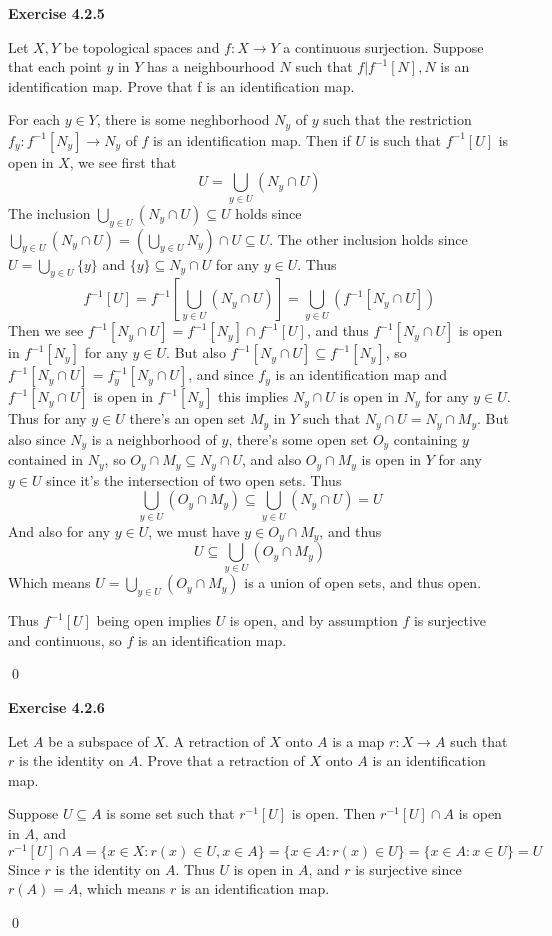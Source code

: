 \documentclass[12pt]{article}
\newcommand{\qcolor}{Gray}
\newcommand{\acolor}{Black}
\newcommand{\question}[1]{
	\color{\qcolor} 
	\item[#1~]}
\newcommand{\answer}[0]{
	\color{\acolor} 
	\item[]}
\newenvironment{exercise}[1]
{
	{
		\Large
		\color{\acolor}
		\addtolength\leftskip{-2em}
		\textbf{Exercise #1}
		
	}
	\begin{list}{}
	{
		\setlength\leftmargin{1em}
		\setlength\rightmargin{0em}
		\setlength\labelwidth{2em}
		\setlength\itemsep{0em}
		\setlength\parsep{0.5em}
		\setlength\baselineskip{1.25em}
	}
}
{
  \qed{}
  \end{list}
}
\begin{document}
\begin{exercise}{4.2.5}
  \question{} Let $X, Y$ be topological spaces and $f : X \to Y$ a continuous surjection. Suppose that each point $y$ in $Y$ has a neighbourhood $N$ such that $f| f^{-1}[N], N$ is an identification map. Prove that f is an identification map.
  \answer
  For each $y \in Y$, there is some neghborhood $N_y$ of $y$ such that the restriction $f_y : f^{-1}[N_y] \to N_y$ of $f$ is an identification map. Then if $U$ is such that $f^{-1}[U]$ is open in $X$, we see first that
  $$U = \bigcup_{y \in U} (N_y \cap U)$$
  The inclusion $\bigcup_{y \in U} (N_y \cap U) \subseteq U$ holds since $\bigcup_{y \in U} (N_y \cap U) = \left(\bigcup_{y \in U} N_y \right) \cap U \subseteq U$. The other inclusion holds since $U = \bigcup_{y \in U} \{y\}$ and $\{y\} \subseteq N_y \cap U$ for any $y \in U$. Thus
  $$f^{-1}[U] = f^{-1}\left[\bigcup_{y \in U} (N_y \cap U)\right] = \bigcup_{y \in U} (f^{-1}[N_y \cap U])$$
  Then we see $f^{-1}[N_y \cap U] = f^{-1}[N_y] \cap f^{-1}[U]$, and thus $f^{-1}[N_y \cap U]$ is open in $f^{-1}[N_y]$ for any $y \in U$. But also $f^{-1}[N_y \cap U] \subseteq f^{-1}[N_y]$, so $f^{-1}[N_y \cap U] = f_y^{-1}[N_y \cap U]$, and since $f_y$ is an identification map and $f^{-1}[N_y \cap U]$ is open in $f^{-1}[N_y]$ this implies $N_y \cap U$ is open in $N_y$ for any $y \in U$. Thus for any $y \in U$ there's an open set $M_y$ in $Y$ such that $N_y \cap U = N_y \cap M_y$. But also since $N_y$ is a neighborhood of $y$, there's some open set $O_y$ containing $y$ contained in $N_y$, so $O_y \cap M_y \subseteq N_y \cap U$, and also $O_y \cap M_y$ is open in $Y$ for any $y \in U$ since it's the intersection of two open sets. Thus
  $$\bigcup_{y \in U} (O_y \cap M_y) \subseteq \bigcup_{y \in U} (N_y \cap U) = U$$
  And also for any $y \in U$, we must have $y \in O_y \cap M_y$, and thus
  $$U \subseteq \bigcup_{y \in U} (O_y \cap M_y)$$
  Which means $U = \bigcup_{y \in U} (O_y \cap M_y)$ is a union of open sets, and thus open.

  Thus $f^{-1}[U]$ being open implies $U$ is open, and by assumption $f$ is surjective and continuous, so $f$ is an identification map.
\end{exercise}

\begin{exercise}{4.2.6}
  \question{} Let $A$ be a subspace of $X$. A retraction of $X$ onto $A$ is a map $r : X \to A$ such that $r$ is the identity on $A$. Prove that a retraction of $X$ onto $A$ is an identification map.
  \answer
  Suppose $U \subseteq A$ is some set such that $r^{-1}[U]$ is open. Then $r^{-1}[U] \cap A$ is open in $A$, and
  $$r^{-1}[U] \cap A = \{ x \in X : r(x) \in U, x \in A \} = \{ x \in A : r(x) \in U \} = \{ x \in A : x \in U \} = U$$
  Since $r$ is the identity on $A$. Thus $U$ is open in $A$, and $r$ is surjective since $r(A) = A$, which means $r$ is an identification map.
\end{exercise}
\end{document}
